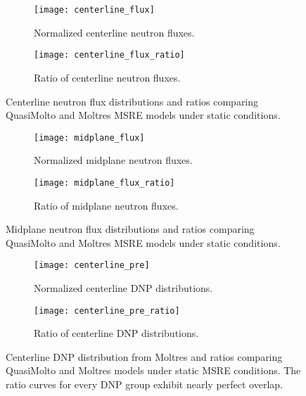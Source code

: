 \begin{figure}[htb]
  \centering
  \begin{subfigure}[b]{0.48\columnwidth}
    \centering
    \texttt{[image: centerline\_flux]}
    \caption{Normalized centerline neutron fluxes.}
    \label{fig:centerline-flux-dist}
  \end{subfigure}
  \hfill
  \begin{subfigure}[b]{0.48\columnwidth}
    \centering
    \texttt{[image: centerline\_flux\_ratio]}
    \caption{Ratio of centerline neutron fluxes.}
    \label{fig:centerline-flux-ratio}
  \end{subfigure}
  \caption{Centerline neutron flux distributions and ratios comparing QuasiMolto and Moltres
  \gls{MSRE} models under static conditions.}
  \label{fig:centerline-flux}
\end{figure}

\begin{figure}[htb]
  \centering
  \begin{subfigure}[b]{0.48\columnwidth}
    \centering
    \texttt{[image: midplane\_flux]}
    \caption{Normalized midplane neutron fluxes.}
    \label{fig:centerline-flux-dist}
  \end{subfigure}
  \hfill
  \begin{subfigure}[b]{0.48\columnwidth}
    \centering
    \texttt{[image: midplane\_flux\_ratio]}
    \caption{Ratio of midplane neutron fluxes.}
    \label{fig:centerline-flux-ratio}
  \end{subfigure}
  \caption{Midplane neutron flux distributions and ratios comparing QuasiMolto and Moltres
  \gls{MSRE} models under static conditions.}
  \label{fig:centerline-flux}
\end{figure}

\begin{figure}[htb]
  \centering
  \begin{subfigure}[b]{0.48\columnwidth}
    \centering
    \texttt{[image: centerline\_pre]}
    \caption{Normalized centerline \gls{DNP} distributions.}
    \label{fig:centerline-pre-dist}
  \end{subfigure}
  \hfill
  \begin{subfigure}[b]{0.48\columnwidth}
    \centering
    \texttt{[image: centerline\_pre\_ratio]}
    \caption{Ratio of centerline \gls{DNP} distributions.}
    \label{fig:centerline-pre-ratio}
  \end{subfigure}
  \caption{Centerline \gls{DNP} distribution from Moltres and ratios comparing QuasiMolto and
  Moltres models under static \gls{MSRE} conditions. The ratio curves for every \gls{DNP} group
  exhibit nearly perfect overlap.}
  \label{fig:centerline-pre}
\end{figure}


